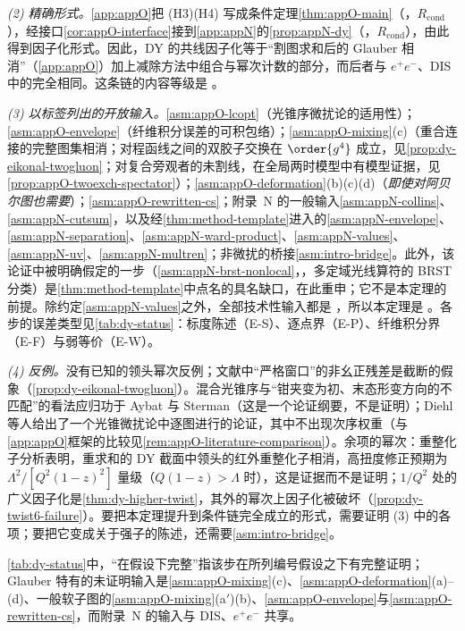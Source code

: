 \emph{(2) 精确形式。}\cref{app:appO}把 (H3)(H4) 写成条件定理\cref{thm:appO-main}（\tagR，$R_{\mathrm{cond}}$），经接口\cref{cor:appO-interface}接到\cref{app:appN}的\cref{prop:appN-dy}（\tagR，$R_{\mathrm{cond}}$），由此得到因子化形式。因此，DY 的共线因子化等于“割图求和后的 Glauber 相消”（\cref{app:appO}）加上减除方法中组合与幂次计数的部分，而后者与 $e^+e^-$、DIS 中的完全相同。这条链的内容等级是 \tagA。

\emph{(3) 以标签列出的开放输入。}\cref{asm:appO-lcopt}（光锥序微扰论的适用性）；\cref{asm:appO-envelope}（纤维积分误差的可积包络）；\cref{asm:appO-mixing}(c)（重合连接的完整图集相消；对程函线之间的双胶子交换在 $\order{g^4}$ 成立，见\cref{prop:dy-eikonal-twogluon}；对复合旁观者的未割线，在全局两时模型中有模型证据，见\cref{prop:appO-twoexch-spectator}）；\cref{asm:appO-deformation}(b)(c)(d)（\emph{即使对阿贝尔图也需要}）；\cref{asm:appO-rewritten-cs}；附录~N 的一般输入\cref{asm:appN-collins}、\cref{asm:appN-cutsum}，以及经\cref{thm:method-template}进入的\cref{asm:appN-envelope}、\cref{asm:appN-separation}、\cref{asm:appN-ward-product}、\cref{asm:appN-values}、\cref{asm:appN-uv}、\cref{asm:appN-multren}；非微扰的桥接\cref{asm:intro-bridge}。此外，该论证中被明确假定的一步（\cref{asm:appN-brst-nonlocal}，\tagC，多定域光线算符的 BRST 分类）是\cref{thm:method-template}中点名的具名缺口，在此重申；它不是本定理的前提。除约定\cref{asm:appN-values}之外，全部技术性输入都是 \tagA，所以本定理是 \tagA。各步的误差类型见\cref{tab:dy-status}：标度陈述（E-S）、逐点界（E-P）、纤维积分界（E-F）与弱等价（E-W）。

\emph{(4) 反例。}没有已知的领头幂次反例；文献中“严格窗口”的非幺正残差是截断的假象（\cref{prop:dy-eikonal-twogluon}）。混合光锥序与“钳夹变为初、末态形变方向的不匹配”的看法应归功于 Aybat 与 Sterman\cite{AybatSterman2009}（这是一个论证纲要，不是证明）；Diehl 等人给出了一个光锥微扰论中逐图进行的论证，其中不出现次序权重\cite[第~4~节]{Diehl:2015bca}（与\cref{app:appO}框架的比较见\cref{rem:appO-literature-comparison}）。余项的幂次：重整化子分析表明，重求和的 DY 截面中领头的红外重整化子相消，高扭度修正预期为 $\Lambda^2/[Q^2(1-z)^2]$ 量级（$Q(1-z)>\Lambda$ 时）\cite{BenekeBraun1995b}，这是证据而不是证明；$1/Q^2$ 处的广义因子化是\cref{thm:dy-higher-twist}，其外的幂次上因子化被破坏（\cref{prop:dy-twist6-failure}）。要把本定理提升到条件链完全成立的形式，需要证明 (3) 中的各项；要把它变成关于强子的陈述，还需要\cref{asm:intro-bridge}。



\cref{tab:dy-status}中，“在假设下完整”指该步在所列编号假设之下有完整证明；Glauber 特有的未证明输入是\cref{asm:appO-mixing}(c)、\cref{asm:appO-deformation}(a)--(d)、一般软子图的\cref{asm:appO-mixing}(a$'$)(b)、\cref{asm:appO-envelope}与\cref{asm:appO-rewritten-cs}，而附录~N 的输入与 DIS、$e^+e^-$ 共享。

